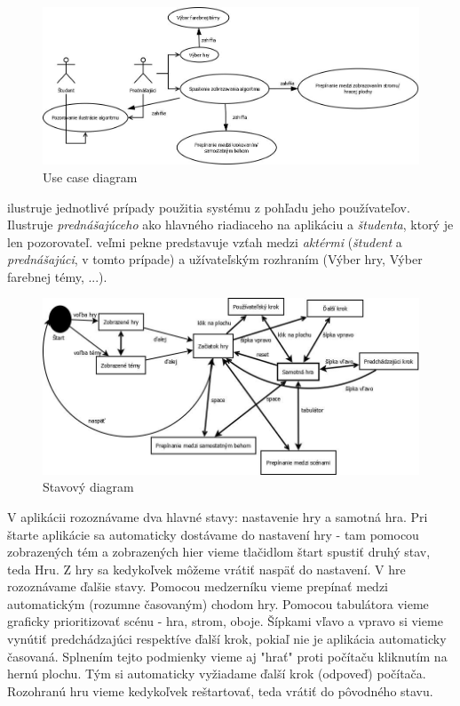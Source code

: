 \documentclass{article}
\begin{document}
\begin{figure}[H]
	\centering
	\includegraphics[width=\textwidth]{images/use_case-diagram.jpg}
	\caption{Use case diagram}
	\label{fig:usecase}
\end{figure}
 ilustruje jednotlivé prípady použitia systému z pohľadu jeho používateľov. Ilustruje \emph{prednášajúceho} ako hlavného riadiaceho na aplikáciu a \emph{študenta}, ktorý je len pozorovateľ.  veľmi pekne predstavuje vzťah medzi \emph{aktérmi} (\emph{študent} a \emph{prednášajúci}, v tomto prípade) a užívateľským rozhraním (Výber hry, Výber farebnej témy, ...).

\begin{figure}[H]
	\centering
	\includegraphics[width=\textwidth]{images/state-diagram.jpg}
	\caption{Stavový diagram}
	\label{fig:state}
\end{figure}
V aplikácii rozoznávame dva hlavné stavy: nastavenie hry a samotná hra.
Pri štarte aplikácie sa automaticky dostávame do nastavení hry - tam pomocou zobrazených tém a zobrazených hier vieme tlačidlom štart spustiť druhý stav, teda Hru. Z hry sa kedykoľvek môžeme vrátiť naspäť do nastavení. V hre rozoznávame ďalšie stavy. Pomocou medzerníku vieme prepínať medzi automatickým (rozumne časovaným) chodom hry. Pomocou tabulátora vieme graficky prioritizovať scénu - hra, strom, oboje. Šípkami vľavo a vpravo si vieme vynútiť predchádzajúci respektíve ďalší krok, pokiaľ nie je aplikácia automaticky časovaná. Splnením tejto podmienky vieme aj "hrať" proti počítaču kliknutím na hernú plochu. Tým si automaticky vyžiadame ďalší krok (odpoveď) počítača. Rozohranú hru vieme kedykoľvek reštartovať, teda vrátiť do pôvodného stavu.
\end{document}

